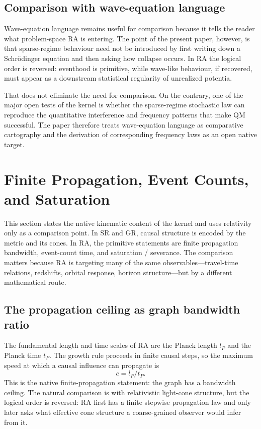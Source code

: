 \documentclass[11pt]{article}
\def\ell{l}%
\def\frac#1#2{#1/#2}%
\begin{document}
\subsection{Comparison with wave-equation language}

Wave-equation language remains useful for comparison because it tells the reader what problem-space RA is entering. The point of the present paper, however, is that sparse-regime behaviour need not be introduced by first writing down a Schr\"odinger equation and then asking how collapse occurs. In RA the logical order is reversed: eventhood is primitive, while wave-like behaviour, if recovered, must appear as a downstream statistical regularity of unrealized potentia.

That does not eliminate the need for comparison. On the contrary, one of the major open tests of the kernel is whether the sparse-regime stochastic law can reproduce the quantitative interference and frequency patterns that make QM successful. The paper therefore treats wave-equation language as comparative cartography and the derivation of corresponding frequency laws as an open native target.

\section{Finite Propagation, Event Counts, and Saturation}
\label{sec:relativistic}

This section states the native kinematic content of the kernel and uses relativity only as a comparison point. In SR and GR, causal structure is encoded by the metric and its cones. In RA, the primitive statements are finite propagation bandwidth, event-count time, and saturation / severance. The comparison matters because RA is targeting many of the same observables---travel-time relations, redshifts, orbital response, horizon structure---but by a different mathematical route.

\subsection{The propagation ceiling as graph bandwidth ratio}

The fundamental length and time scales of RA are the Planck length $\ell_P$ and the Planck time $t_P$. The growth rule proceeds in finite causal steps, so the maximum speed at which a causal influence can propagate is
\begin{equation}
\label{eq:c_bandwidth}
\boxed{c = \frac{\ell_P}{t_P}.}
\end{equation}
This is the native finite-propagation statement: the graph has a bandwidth ceiling. The natural comparison is with relativistic light-cone structure, but the logical order is reversed: RA first has a finite stepwise propagation law and only later asks what effective cone structure a coarse-grained observer would infer from it.
\end{document}
